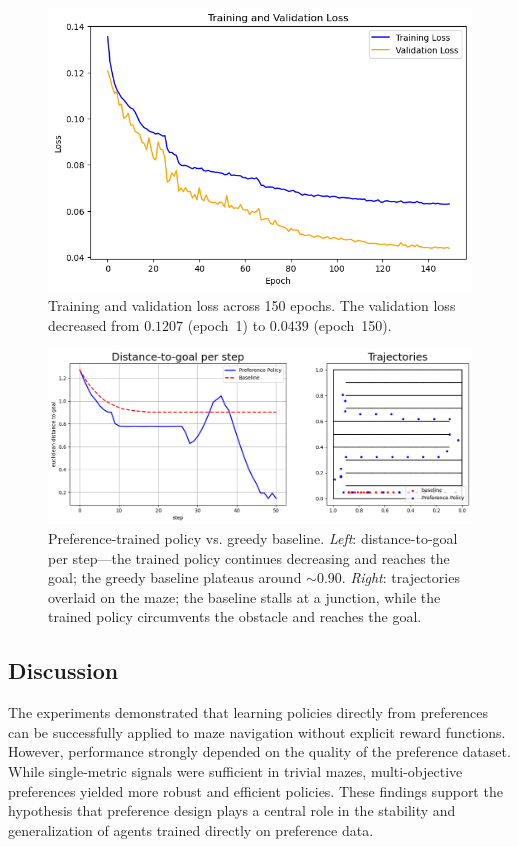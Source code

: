 \documentclass[a4paper,oneside,10pt,ngerman,english]{scrartcl}
\begin{document}
\begin{figure}[H]
  \centering
  \includegraphics[width=0.68\linewidth]{jku-templates-report-latex-master/images/training.png}
  \caption{Training and validation loss across 150 epochs. The validation loss decreased from $0.1207$ (epoch~1) to $0.0439$ (epoch~150).}
  \label{fig:training_curve}
\end{figure}

\begin{figure}[H]
  \centering
  \includegraphics[width=\linewidth]{jku-templates-report-latex-master/images/comparison2.png}
  \caption{Preference-trained policy vs. greedy baseline. \emph{Left}: distance-to-goal per step---the trained policy continues decreasing and reaches the goal; the greedy baseline plateaus around $\sim 0.90$. \emph{Right}: trajectories overlaid on the maze; the baseline stalls at a junction, while the trained policy circumvents the obstacle and reaches the goal.}
  \label{fig:comparison}
\end{figure}

\subsection{Discussion}

The experiments demonstrated that learning policies directly from preferences can be successfully applied to maze navigation without explicit reward functions.
However, performance strongly depended on the quality of the preference dataset.
While single-metric signals were sufficient in trivial mazes, multi-objective preferences yielded more robust and efficient policies.
These findings support the hypothesis that preference design plays a central role in the stability and generalization of agents trained directly on preference data.
\end{document}
